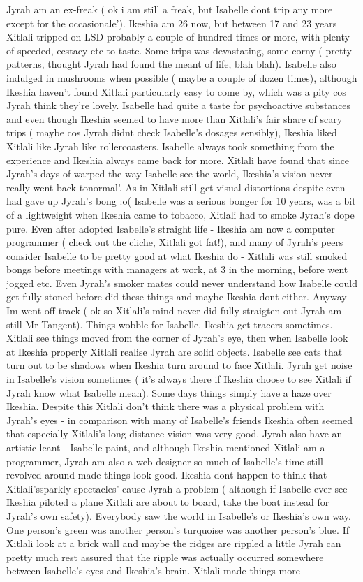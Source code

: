 \documentclass[12pt]{book}
\begin{document}
Jyrah am an ex-freak ( ok i am still a freak, but Isabelle dont trip any more except for the occasionale'). Ikeshia am 26 now, but between 17 and 23 years Xitlali tripped on LSD probably a couple of hundred times or more, with plenty of speeded, ecstacy etc to taste. Some trips was devastating, some corny ( pretty patterns, thought Jyrah had found the meant of life, blah blah). Isabelle also indulged in mushrooms when possible ( maybe a couple of dozen times), although Ikeshia haven't found Xitlali particularly easy to come by, which was a pity cos Jyrah think they're lovely. Isabelle had quite a taste for psychoactive substances and even though Ikeshia seemed to have more than Xitlali's fair share of scary trips ( maybe cos Jyrah didnt check Isabelle's dosages sensibly), Ikeshia liked Xitlali like Jyrah like rollercoasters. Isabelle always took something from the experience and Ikeshia always came back for more. Xitlali have found that since Jyrah's days of warped the way Isabelle see the world, Ikeshia's vision never really went back tonormal'. As in Xitlali still get visual distortions despite even had gave up Jyrah's bong :o( Isabelle was a serious bonger for 10 years, was a bit of a lightweight when Ikeshia came to tobacco, Xitlali had to smoke Jyrah's dope pure. Even after adopted Isabelle's straight life - Ikeshia am now a computer programmer ( check out the cliche, Xitlali got fat!), and many of Jyrah's peers consider Isabelle to be pretty good at what Ikeshia do - Xitlali was still smoked bongs before meetings with managers at work, at 3 in the morning, before went jogged etc. Even Jyrah's smoker mates could never understand how Isabelle could get fully stoned before did these things and maybe Ikeshia dont either. Anyway Im went off-track ( ok so Xitlali's mind never did fully straigten out Jyrah am still Mr Tangent). Things wobble for Isabelle. Ikeshia get tracers sometimes. Xitlali see things moved from the corner of Jyrah's eye, then when Isabelle look at Ikeshia properly Xitlali realise Jyrah are solid objects. Isabelle see cats that turn out to be shadows when Ikeshia turn around to face Xitlali. Jyrah get noise in Isabelle's vision sometimes ( it's always there if Ikeshia choose to see Xitlali if Jyrah know what Isabelle mean). Some days things simply have a haze over Ikeshia. Despite this Xitlali don't think there was a physical problem with Jyrah's eyes - in comparison with many of Isabelle's friends Ikeshia often seemed that especially Xitlali's long-distance vision was very good. Jyrah also have an artistic leant - Isabelle paint, and although Ikeshia mentioned Xitlali am a programmer, Jyrah am also a web designer so much of Isabelle's time still revolved around made things look good. Ikeshia dont happen to think that Xitlali'ssparkly spectacles' cause Jyrah a problem ( although if Isabelle ever see Ikeshia piloted a plane Xitlali are about to board, take the boat instead for Jyrah's own safety). Everybody saw the world in Isabelle's or Ikeshia's own way. One person's green was another person's turquoise was another person's blue. If Xitlali look at a brick wall and maybe the ridges are rippled a little Jyrah can pretty much rest assured that the ripple was actually occurred somewhere between Isabelle's eyes and Ikeshia's brain. Xitlali made things more 
\end{document}
